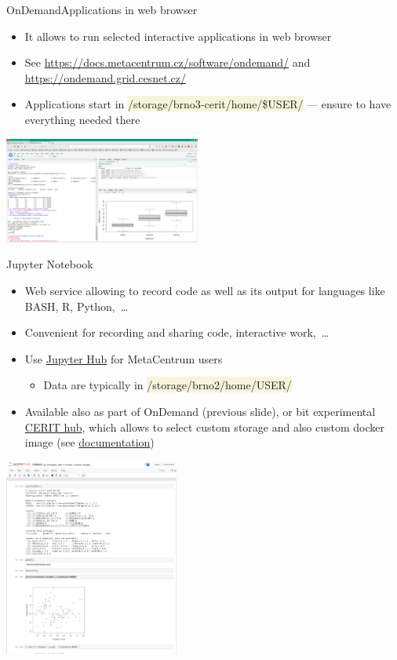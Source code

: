 \documentclass[compress, xelatex, 11pt, xcolor=svgnames, aspectratio=169,
	hyperref={
		bookmarks=true,
		unicode=true,
		colorlinks=true,
		pdftitle={Linux, command line and MetaCentrum},
		plainpages=false,
		pdfauthor={Vojtech Zeisek},
		pdfsubject={Course about use of Linux command line, writing shell scripts and using MetaCentrum of CESNET},
		pdfcreator={XeLaTeX},
		pdfkeywords={Linux, GNU, BASH, shell, command line, MetaCentrum},
		linkcolor=DarkRed, %
		anchorcolor=DarkBlue, %
		citecolor=Indigo, %
		filecolor=NavyBlue, %
		menucolor=DarkMagenta, %
		urlcolor=DarkBlue, %
		},
	url={hyphens, lowtilde} %
	]{beamer}
\renewcommand{\texttt}[1]{\colorbox{Beige}{{\ttfamily #1}}}
\begin{document}
\begin{frame}{OnDemand}{Applications in web browser}
	\begin{itemize}
		\item It allows to run selected interactive applications in web browser
		\item See \url{https://docs.metacentrum.cz/software/ondemand/} and \url{https://ondemand.grid.cesnet.cz/}
		\item Applications start in \texttt{/storage/brno3-cerit/home/\$USER/} --- ensure to have everything needed there
	\end{itemize}
	\begin{center}
		\includegraphics[height=3.5cm]{rstudio_ondemand.png}
	\end{center}
\end{frame}

\begin{frame}{Jupyter Notebook}
	\begin{multicols}{2}
		\begin{itemize}
			\item Web service allowing to record code as well as its output for languages like BASH, R, Python,~\ldots
			\item Convenient for recording and sharing code, interactive work,~\ldots
			\item Use \href{https://docs.metacentrum.cz/related/jupyter/}{Jupyter Hub} for MetaCentrum users
			\begin{itemize}
				\item Data are typically in \texttt{/storage/brno2/home/USER/}
			\end{itemize}
			\item Available also as part of OnDemand (previous slide), or bit experimental \href{https://hub.cloud.e-infra.cz/}{CERIT hub}, which allows to select custom storage and also custom docker image (see \href{https://docs.cerit.io/docs/jupyterhub.html}{documentation})
		\end{itemize}
		\begin{center}
			\includegraphics[height=6.5cm]{jupyter.png}
		\end{center}
	\end{multicols}
\end{frame}
\end{document}

